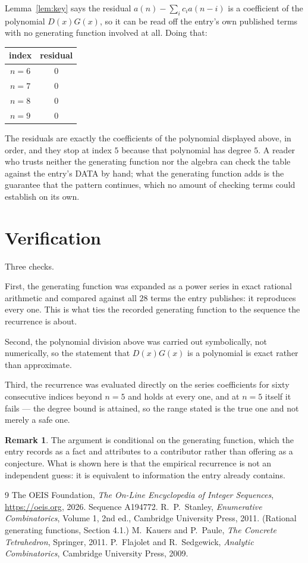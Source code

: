 \documentclass[11pt,a4paper]{article}
\theoremstyle{plain}
\theoremstyle{definition}
\newtheorem{remark}[theorem]{Remark}
\begin{document}
Lemma~\ref{lem:key} says the residual $a(n)-\sum_ic_ia(n-i)$ is a coefficient of the
polynomial $D(x)G(x)$, so it can be read off the entry's own published terms with no
generating function involved at all. Doing that:
\begin{center}
\begin{tabular}{cc}
index & residual \\ \hline
$n=6$ & $0$ \\
$n=7$ & $0$ \\
$n=8$ & $0$ \\
$n=9$ & $0$
\end{tabular}
\end{center}
The residuals are exactly the coefficients of the polynomial displayed above, in order, and
they stop at index $5$ because that polynomial has degree $5$. A reader who trusts
neither the generating function nor the algebra can check the table against the entry's DATA
by hand; what the generating function adds is the guarantee that the pattern continues, which
no amount of checking terms could establish on its own.

\section{Verification}

Three checks.

First, the generating function was expanded as a power series in exact rational arithmetic and
compared against all $28$ terms the entry publishes: it reproduces every one. This is
what ties the recorded generating function to the sequence the recurrence is about.

Second, the polynomial division above was carried out symbolically, not numerically, so the
statement that $D(x)G(x)$ is a polynomial is exact rather than approximate.

Third, the recurrence was evaluated directly on the series coefficients for sixty consecutive
indices beyond $n=5$ and holds at every one, and at $n=5$ itself it fails --- the
degree bound is attained, so the range stated is the true one and not merely a safe one.

\begin{remark}
The argument is conditional on the generating function, which the entry records as a fact and
attributes to a contributor rather than offering as a conjecture. What is shown here is that
the empirical recurrence is not an independent guess: it is equivalent to information the
entry already contains.
\end{remark}

\begin{thebibliography}{9}
 The OEIS Foundation, \emph{The On-Line Encyclopedia of Integer
Sequences}, \url{https://oeis.org}, 2026. Sequence A194772.
 R.~P.~Stanley, \emph{Enumerative Combinatorics}, Volume 1, 2nd ed.,
Cambridge University Press, 2011. (Rational generating functions, Section 4.1.)
 M.~Kauers and P.~Paule, \emph{The Concrete Tetrahedron}, Springer, 2011.
 P.~Flajolet and R.~Sedgewick, \emph{Analytic Combinatorics}, Cambridge
University Press, 2009.
\end{thebibliography}
\end{document}
